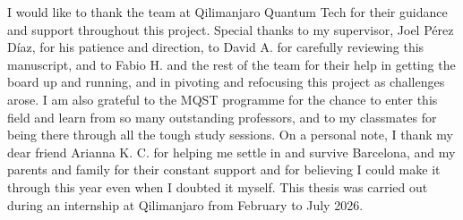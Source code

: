 \documentclass[a4paper,onecolumn,11pt,unpublished]{quantumarticle}
\begin{document}
I would like to thank the team at Qilimanjaro Quantum Tech for their guidance and
support throughout this project. Special thanks to my supervisor, Joel Pérez Díaz,
for his patience and direction, to David A. for carefully reviewing this manuscript,
and to Fabio H. and the rest of the team for their help in getting the board up and
running, and in pivoting and refocusing this project as challenges arose. I am also
grateful to the MQST programme for the chance to enter this field and learn from so
many outstanding professors, and to my classmates for being there through all the
tough study sessions. On a personal note, I thank my dear friend Arianna K. C. for helping me settle in and survive Barcelona, and my parents and family
for their constant support and for believing I could make it through this year even
when I doubted it myself. This thesis was carried out during an internship at
Qilimanjaro from February to July 2026.


\newpage
\end{document}
